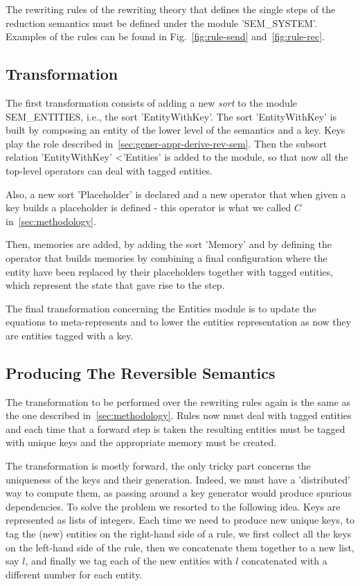 \documentclass{article}[12pt,a4paper]
\theoremstyle{definition}
\begin{document}
The rewriting rules of the rewriting theory that defines the
single steps of the reduction semantics must be defined under the module
'SEM_SYSTEM'. Examples of the rules can be found in Fig.~\ref{fig:rule-send} and~\ref{fig:rule-rec}.

\subsection{Transformation}

The first transformation consists of adding a new \emph{sort} to the module
SEM_ENTITIES,
i.e., the sort 'EntityWithKey'. The sort 'EntityWithKey' is built by composing
an entity of the lower level of the semantics and a key. Keys play the role
described in~\ref{sec:gener-appr-derive-rev-sem}. Then the subsort relation 'EntityWithKey'
\textless 'Entities' is added to the module, so that now all the top-level operators can
deal with tagged entities. 

Also, a new sort 'Placeholder' is declared and a new operator that when given a key
builds a placeholder is defined - this operator is what we called $C$ in~\ref{sec:methodology}.

Then, memories are added, by adding the sort 'Memory' and by defining the
operator that builds memories by combining a final configuration where the
entity have been replaced by their placeholders together with tagged entities,
which represent the state that gave rise to the step.

The final transformation concerning the Entities module is to update the
equations to meta-represents and to lower the entities representation as now they are entities tagged with a key.


\subsection{Producing The Reversible Semantics}

The transformation to be performed over the rewriting rules again is the same as the
one described in~\ref{sec:methodology}. Rules now must deal with tagged entities and
each time that a forward step is taken the resulting entities must be tagged
with unique keys and the appropriate memory must be created.

The transformation is mostly forward, the only tricky part concerns the
uniqueness of the keys and their generation. Indeed, we must have a 'distributed' way to compute
them, as passing around a key generator would produce spurious dependencies. To
solve the problem we resorted to the following idea. Keys are represented as lists of
integers. Each time we need to produce new unique keys, to tag the (new) entities on
the right-hand side of a rule, we first collect all the keys on
the left-hand side of the rule, then we concatenate them together to a new list, say
$l$, and finally we tag
each of the new entities with $l$ concatenated with a different number for each
entity.
\end{document}
